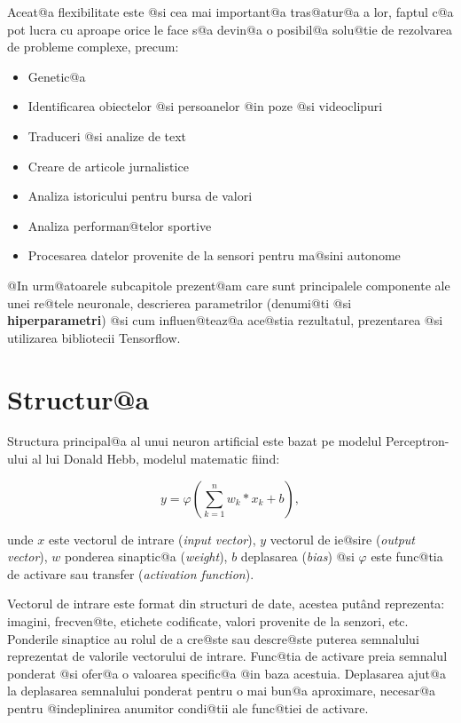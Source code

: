 Aceat@a flexibilitate este @si cea mai important@a tras@atur@a a lor, faptul c@a pot lucra cu aproape orice le face s@a devin@a o posibil@a solu@tie de rezolvarea de probleme complexe, precum: 

\begin{itemize}
	\item Genetic@a
	\item Identificarea obiectelor @si persoanelor @in poze @si videoclipuri
	\item Traduceri @si analize de text
	\item Creare de articole jurnalistice
	\item Analiza istoricului pentru bursa de valori
	\item Analiza performan@telor sportive
	\item Procesarea datelor provenite de la sensori pentru ma@sini autonome
\end{itemize}

@In urm@atoarele subcapitole prezent@am care sunt principalele componente ale unei re@tele neuronale, descrierea parametrilor (denumi@ti @si \textbf{hiperparametri}) @si cum influen@teaz@a ace@stia rezultatul, prezentarea @si utilizarea bibliotecii Tensorflow.

\section{Structur@a}

Structura principal@a al unui neuron artificial este bazat pe modelul Perceptron-ului al lui Donald Hebb, modelul matematic fiind:

$$
	y = \varphi \left( \sum_{k=1}^{n} w_k * x_k + b \right),
$$


\noindent unde $x$ este vectorul de intrare ({\sl input vector}), $y$ vectorul de ie@sire ({\sl output vector}), $w$ ponderea sinaptic@a ({\sl weight}), $b$ deplasarea ({\sl bias}) @si $\varphi$ este func@tia de activare sau transfer ({\sl activation function}).

Vectorul de intrare este format din structuri de date, acestea put\^ and reprezenta: imagini, frecven@te, etichete codificate, valori provenite de la senzori, etc. Ponderile sinaptice au rolul de a cre@ste sau descre@ste puterea semnalului reprezentat de valorile vectorului de intrare. Func@tia de activare preia semnalul ponderat @si ofer@a o valoarea specific@a @in baza acestuia. Deplasarea ajut@a la deplasarea semnalului ponderat pentru o mai bun@a aproximare, necesar@a pentru @indeplinirea anumitor condi@tii ale func@tiei de activare.

